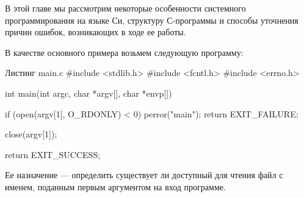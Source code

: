В этой главе мы рассмотрим некоторые особенности системного программирования на языке Си, структуру С-программы и способы уточнения причин ошибок, возникающих в ходе ее работы.

В качестве основного примера возьмем следующую программу:

\begin{CCode}{Листинг main.c}
			#include <stdlib.h>
			#include <fcntl.h>
			#include <errno.h>			
		
			int main(int argc, char *argv[], char *envp[]) { 
				
				if (open(argv[1], O_RDONLY) < 0) {
					perror("main");			
					return EXIT_FAILURE;
				}	 
				
 				close(argv[1]);
 				
 				return EXIT_SUCCESS;
			} 
\end{CCode}

Ее назначение --- определить существует ли доступный для чтения файл с именем, поданным первым аргументом на вход программе.
